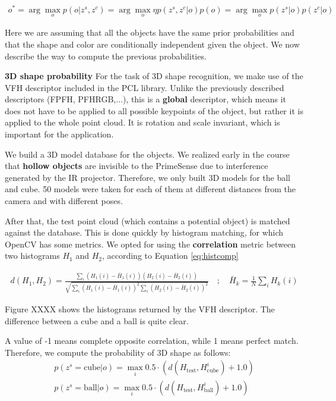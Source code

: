 \begin{align}
\label{eq:obj_map}
o^* = \arg\max_o p(o|z^s, z^c) = \arg\max_o \eta p(z^s, z^c|o) p(o) = \arg\max_o p(z^s|o)p(z^c|o)
\end{align}

Here we are assuming that all the objects have the same prior probabilities and that the shape and color are conditionally independent given the object. 
We now describe the way to compute the previous probabilities.

\textbf{3D shape probability}
For the task of 3D shape recognition, we make use of the VFH descriptor included in the PCL library. Unlike the previously described descriptors (FPFH, PFHRGB,...), this is a \textbf{global} descriptor, which means it does not have to be applied to all possible keypoints of the object, but rather it is applied to the whole point cloud. It is rotation and scale invariant, which is important for the application. 

We build a 3D model database for the objects. We realized early in the course that \textbf{hollow objects} are invisible to the PrimeSense due to interference generated by the IR projector. Therefore, we only built 3D models for the ball and cube. 50 models were taken for each of them at different distances from the camera and with different poses. 

After that, the test point cloud (which contains a potential object) is matched against the database. This is done quickly by histogram matching, for which OpenCV has some metrics. We opted for using the \textbf{correlation} metric between two histograms $H_1$ and $H_2$, according to Equation \ref{eq:histcomp}


\begin{align}
d(H_1, H_2) = \frac{\sum_i (H_1(i) - \bar{H}_1(i))(H_2(i)-\bar{H}_2(i))}{\sqrt{\sum_i(H_1(i) - \bar{H}_1(i))^2\sum_i(H_2(i) - \bar{H}_2(i))^2}}
\quad ; \quad
\bar{H}_k = \frac{1}{N}\sum_i H_k(i)
\end{align}

Figure XXXX shows the histograms returned by the VFH descriptor. The difference between a cube and a ball is quite clear. 

A value of -1 means complete opposite correlation, while 1 means perfect match. Therefore, we compute the probability of 3D shape as follows:
\begin{align}
p(z^s = \text{cube} | o) = \max_i 0.5\cdot(d(H_{\text{test}}, H_{\text{cube}}^i) + 1.0) \\
p(z^s = \text{ball} | o) = \max_i 0.5\cdot(d(H_{\text{test}}, H_{\text{ball}}^i) + 1.0) \\
\end{align}

